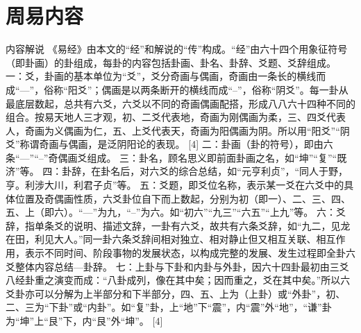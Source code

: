 \documentclass[12pt,UTF8]{ctexbook}
\begin{document}
\section{周易内容}

内容解说
《易经》由本文的“经”和解说的“传”构成。“经”由六十四个用象征符号（即卦画）的卦组成，每卦的内容包括卦画、卦名、卦辞、爻题、爻辞组成。
一：爻，卦画的基本单位为“爻”，爻分奇画与偶画，奇画由一条长的横线而成“—”，俗称“阳爻”；偶画是以两条断开的横线而成“--”，俗称“阴爻”。每一卦从最底层数起，总共有六爻，六爻以不同的奇画偶画配搭，形成八八六十四种不同的组合。按易天地人三才观，初、二爻代表地，奇画为刚偶画为柔，三、四爻代表人，奇画为义偶画为仁，五、上爻代表天，奇画为阳偶画为阴。所以用“阳爻”“阴爻”称谓奇画与偶画，是泛阴阳论的表现。 [4]
二：卦画（卦的符号），即由六条“—”“--”奇偶画爻组成。
三：卦名，顾名思义即前面卦画之名，如“坤”“复”“既济”等。
四：卦辞，在卦名后，对六爻的综合总结，如“元亨利贞”，“同人于野，亨。利涉大川，利君子贞”等。
五：爻题，即爻位名称，表示某一爻在六爻中的具体位置及奇偶画性质，六爻卦位自下而上数起，分别为初（即一）、二、三、四、五、上（即六）。“—”为九，“--”为六。如“初六”“九三”“六五”“上九”等。
六：爻辞，指单条爻的说明、描述文辞，一卦有六爻，故共有六条爻辞，如“九二，见龙在田，利见大人。”同一卦六条爻辞间相对独立、相对静止但又相互关联、相互作用，表示不同时间、阶段事物的发展状态，以构成完整的发展、发生过程即全卦六爻整体内容总结—卦辞。
七：上卦与下卦和内卦与外卦，因六十四卦最初由三爻八经卦重之演变而成：“八卦成列，像在其中矣；因而重之，爻在其中矣。”所以六爻卦亦可以分解为上半部分和下半部分，四、五、上为（上卦）或“外卦”，初、二、三为“下卦”或“内卦”。如“复”卦，上“地”下“震”，内“震”外“地”，“谦”卦为“坤”上“艮”下，内“艮”外“坤”。 [4]
\end{document}
